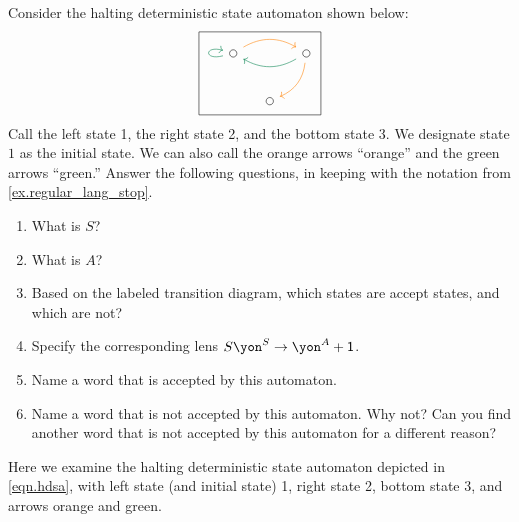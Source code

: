 \documentclass[Book-Poly]{subfiles}
\begin{document}
\begin{exercise}\label{exc.det_fsa_misc_398}
Consider the halting deterministic state automaton shown below:
\begin{equation} \label{eqn.hdsa}
\begin{tikzpicture}
\node[draw] {
\begin{tikzcd}[column sep=small]
	\LMO{}\ar[rr, bend left, orange]\ar[loop left, dgreen]&&
	\LMO{}\ar[dl, bend left, orange]\ar[ll, dgreen, bend left]\\&
	\LMO{}
\end{tikzcd}
};
\end{tikzpicture}
\end{equation}
Call the left state 1, the right state 2, and the bottom state 3.
We designate state $1$ as the initial state.
We can also call the orange arrows ``{\color{orange}orange}'' and the green arrows ``{\color{dgreen}green}.''
Answer the following questions, in keeping with the notation from \cref{ex.regular_lang_stop}.

\begin{enumerate}
	\item What is $S$?
	\item What is $A$?
	\item Based on the labeled transition diagram, which states are accept states, and which are not?
	\item Specify the corresponding lens $S\yon^S\to\yon^A+\1$.
	\item Name a word that is accepted by this automaton.
	\item Name a word that is not accepted by this automaton.
	Why not?
	Can you find another word that is not accepted by this automaton for a different reason?
\qedhere
\end{enumerate}
\begin{solution}
Here we examine the halting deterministic state automaton depicted in \eqref{eqn.hdsa}, with left state (and initial state) 1, right state 2, bottom state 3, and arrows {\color{orange}orange} and {\color{dgreen}green}.


\end{solution}
\end{exercise}
\end{document}
